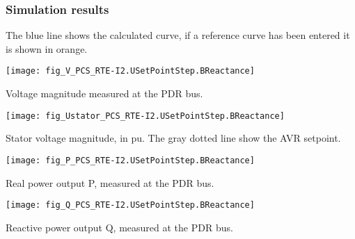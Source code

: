     \subsubsection{Simulation results}
    The blue line shows the calculated curve, if a reference curve has been entered it is
    shown in orange.

    \noindent
    \begin{minipage}[t]{0.48\textwidth}
        \centering
        \texttt{[image: fig\_V\_PCS\_RTE-I2.USetPointStep.BReactance]}
        \begin{minipage}[t]{0.8\textwidth}
            \small Voltage magnitude measured at the PDR bus.
        \end{minipage}
    \end{minipage}
    \hfill
        \begin{minipage}[t]{0.48\textwidth}
            \centering
            \texttt{[image: fig\_Ustator\_PCS\_RTE-I2.USetPointStep.BReactance]}
            \begin{minipage}[t]{0.8\textwidth}
                \small Stator voltage magnitude, in pu. The gray dotted line show
                the AVR setpoint.
            \end{minipage}
        \end{minipage}

    \vspace{0.5cm}

    \noindent
    \begin{minipage}[t]{0.48\textwidth}
        \centering
        \texttt{[image: fig\_P\_PCS\_RTE-I2.USetPointStep.BReactance]}
        \begin{minipage}[t]{0.8\textwidth}
            \small Real power output P, measured at the PDR bus.
        \end{minipage}
    \end{minipage}
    \hfill
    \begin{minipage}[t]{0.48\textwidth}
        \centering
        \texttt{[image: fig\_Q\_PCS\_RTE-I2.USetPointStep.BReactance]}
        \begin{minipage}[t]{0.8\textwidth}
            \small Reactive power output Q, measured at the PDR bus.
        \end{minipage}
    \end{minipage}

    \vspace{0.5cm}


